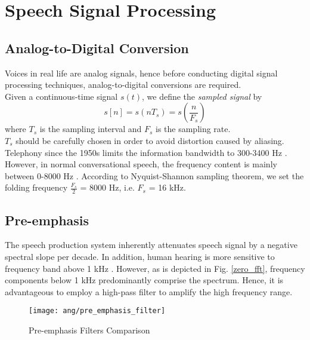 \newpage
\section{Speech Signal Processing}

\subsection{Analog-to-Digital Conversion}
Voices in real life are analog signals, hence before conducting digital signal processing techniques, analog-to-digital conversions are required.\\

Given a continuous-time signal $s(t)$, we define the \textit{sampled signal} by
\begin{equation}
s[n] = s(nT_s) = s(\frac{n}{F_s})
\end{equation}
where $T_s$ is the sampling interval and $F_s$ is the sampling rate.\\

$T_s$ should be carefully chosen in order to avoid distortion caused by aliasing. Telephony since the 1950s limits the information bandwidth to 300-3400 Hz \cite{EVW-report}. However, in normal conversational speech, the frequency content is mainly between 0-8000 Hz \cite{uysal2005bandwidth}. According to Nyquist-Shannon sampling theorem, we set the folding frequency $\frac{F_s}{2}$ = 8000 Hz, i.e. $F_s$ = 16 kHz.


\subsection{Pre-emphasis}

The speech production system inherently attenuates speech signal by a negative spectral slope per decade. In addition, human hearing is more sensitive to frequency band above 1 kHz \cite{picone1993signal}. However, as is depicted in Fig. \ref{zero_fft}, frequency components below 1 kHz predominantly comprise the spectrum. Hence, it is advantageous to employ a high-pass filter to amplify the high frequency range.

\begin{figure}[H]
\centering
\texttt{[image: ang/pre\_emphasis\_filter]}
\caption{Pre-emphasis Filters Comparison}
\label{pre_emphasis_filter}
\end{figure}

